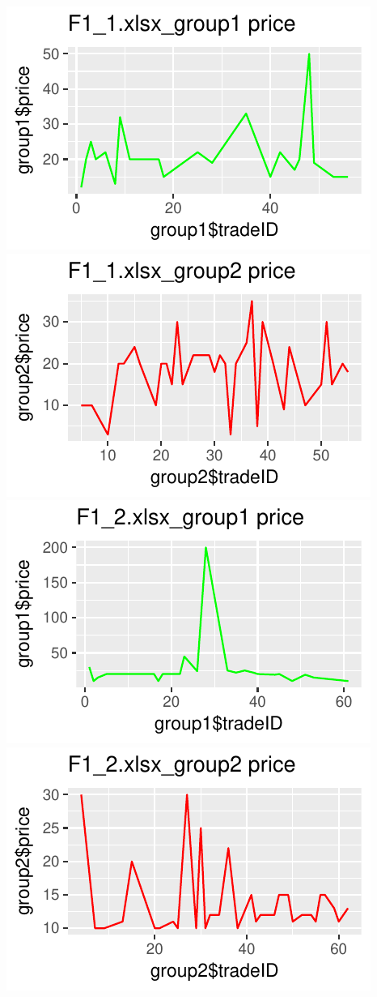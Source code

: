 \documentclass[]{article}
\begin{document}
\includegraphics{finance_homework_files/figure-latex/unnamed-chunk-3-1.pdf}
\includegraphics{finance_homework_files/figure-latex/unnamed-chunk-3-2.pdf}
\includegraphics{finance_homework_files/figure-latex/unnamed-chunk-3-3.pdf}
\includegraphics{finance_homework_files/figure-latex/unnamed-chunk-3-4.pdf}
\end{document}
